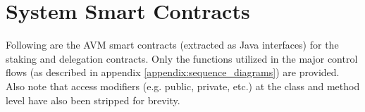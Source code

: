 

\section{System Smart Contracts}
\label{appendix:contract}

Following are the AVM smart contracts (extracted as Java interfaces) for the staking and delegation contracts. Only the functions utilized in the major control flows (as described in appendix \ref{appendix:sequence_diagrams}) are provided. Also note that access modifiers (e.g. public, private, etc.) at the class and method level have also been stripped for brevity.


